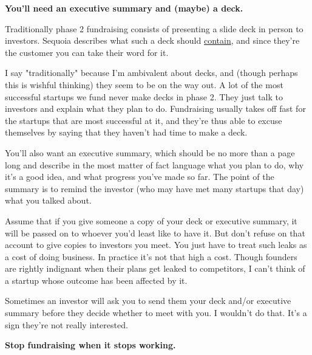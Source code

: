                    \textbf{You'll need an executive summary and (maybe) a deck.}

Traditionally phase 2 fundraising consists of
                    presenting a slide deck in person to investors. Sequoia
                    describes what such a deck should
                    \href{http://www.sequoiacap.com/ideas}{contain}, and
                    since they're the customer you can take their word for
                    it.

I say "traditionally" because I'm ambivalent
                    about decks, and (though perhaps this is wishful thinking)
                    they seem to be on the way out. A lot of the most successful
                    startups we fund never make decks in phase 2. They just talk
                    to investors and explain what they plan to do. Fundraising
                    usually takes off fast for the startups that are most
                    successful at it, and they're thus able to excuse themselves
                    by saying that they haven't had time to make a deck.

You'll
                    also want an executive summary, which should be no more than
                    a page long and describe in the most matter of fact language
                    what you plan to do, why it's a good idea, and what progress
                    you've made so far. The point of the summary is to remind
                    the investor (who may have met many startups that day) what
                    you talked about.

Assume that if you give someone
                    a copy of your deck or executive summary, it will be passed
                    on to whoever you'd least like to have it. But don't refuse
                    on that account to give copies to investors you meet. You
                    just have to treat such leaks as a cost of doing business.
                    In practice it's not that high a cost. Though founders are
                    rightly indignant when their plans get leaked to
                    competitors, I can't think of a startup whose outcome has
                    been affected by it.

Sometimes an investor will
                    ask you to send them your deck and/or executive summary
                    before they decide whether to meet with you. I wouldn't do
                    that. It's a sign they're not really interested.


                    \textbf{Stop fundraising when it stops working.}

